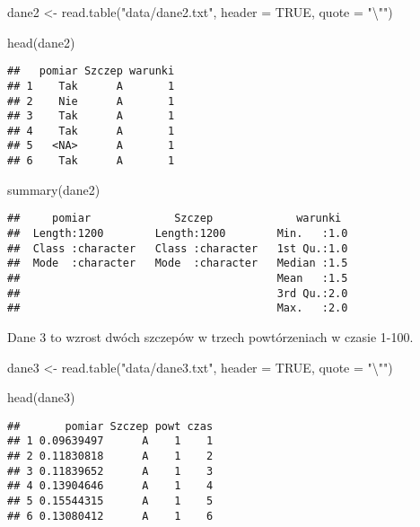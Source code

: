 \documentclass[
]{book}
\newenvironment{Shaded}{\begin{snugshade}}{\end{snugshade}}
\newcommand{\AttributeTok}[1]{\textcolor[rgb]{0.77,0.63,0.00}{#1}}
\newcommand{\ConstantTok}[1]{\textcolor[rgb]{0.00,0.00,0.00}{#1}}
\newcommand{\FunctionTok}[1]{\textcolor[rgb]{0.00,0.00,0.00}{#1}}
\newcommand{\NormalTok}[1]{#1}
\newcommand{\OtherTok}[1]{\textcolor[rgb]{0.56,0.35,0.01}{#1}}
\newcommand{\SpecialCharTok}[1]{\textcolor[rgb]{0.00,0.00,0.00}{#1}}
\newcommand{\StringTok}[1]{\textcolor[rgb]{0.31,0.60,0.02}{#1}}
\begin{document}
\begin{Shaded}
\begin{Highlighting}[]
\NormalTok{dane2 }\OtherTok{\textless{}{-}} \FunctionTok{read.table}\NormalTok{(}\StringTok{"data/dane2.txt"}\NormalTok{, }\AttributeTok{header =} \ConstantTok{TRUE}\NormalTok{, }\AttributeTok{quote =} \StringTok{"}\SpecialCharTok{\textbackslash{}"}\StringTok{"}\NormalTok{)}

\FunctionTok{head}\NormalTok{(dane2)}
\end{Highlighting}
\end{Shaded}

\begin{verbatim}
##   pomiar Szczep warunki
## 1    Tak      A       1
## 2    Nie      A       1
## 3    Tak      A       1
## 4    Tak      A       1
## 5   <NA>      A       1
## 6    Tak      A       1
\end{verbatim}

\begin{Shaded}
\begin{Highlighting}[]
\FunctionTok{summary}\NormalTok{(dane2)}
\end{Highlighting}
\end{Shaded}

\begin{verbatim}
##     pomiar             Szczep             warunki   
##  Length:1200        Length:1200        Min.   :1.0  
##  Class :character   Class :character   1st Qu.:1.0  
##  Mode  :character   Mode  :character   Median :1.5  
##                                        Mean   :1.5  
##                                        3rd Qu.:2.0  
##                                        Max.   :2.0
\end{verbatim}

Dane 3 to wzrost dwóch szczepów w trzech powtórzeniach w czasie 1-100.

\begin{Shaded}
\begin{Highlighting}[]
\NormalTok{dane3 }\OtherTok{\textless{}{-}} \FunctionTok{read.table}\NormalTok{(}\StringTok{"data/dane3.txt"}\NormalTok{, }\AttributeTok{header =} \ConstantTok{TRUE}\NormalTok{, }\AttributeTok{quote =} \StringTok{"}\SpecialCharTok{\textbackslash{}"}\StringTok{"}\NormalTok{)}

\FunctionTok{head}\NormalTok{(dane3)}
\end{Highlighting}
\end{Shaded}

\begin{verbatim}
##       pomiar Szczep powt czas
## 1 0.09639497      A    1    1
## 2 0.11830818      A    1    2
## 3 0.11839652      A    1    3
## 4 0.13904646      A    1    4
## 5 0.15544315      A    1    5
## 6 0.13080412      A    1    6
\end{verbatim}
\end{document}
